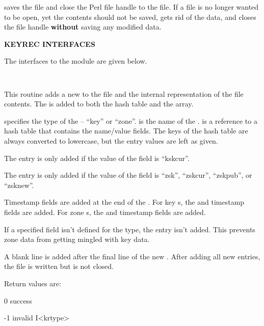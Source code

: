 saves the file and close the Perl file handle to the
 file.  If a  file is no longer wanted to be
open, yet the contents should not be saved,  gets rid
of the data, and closes the file handle {\bf without} saving any modified
data.

{\bf KEYREC INTERFACES}

The interfaces to the  module are given below.

\begin{description}

\item {}\verb" "

This routine adds a new  to the  file and the
internal representation of the file contents.  The  is added to
both the  hash table and the \var{\@keyreclines} array.

 specifies the type of the  -- ``key'' or
``zone''.   is the name of the .  
is a reference to a hash table that contains the name/value 
fields.  The keys of the hash table are always converted to lowercase, but the
entry values are left as given.

The  entry is only added if the value of the 
field is ``kskcur''.

The  entry is only added if the value of the 
field is ``zsk'', ``zskcur'', ``zskpub'', or ``zsknew''.

Timestamp fields are added at the end of the .  For key
s, the  and 
timestamp fields are added.  For zone s, the
 and  timestamp fields are added.

If a specified field isn't defined for the  type, the entry
isn't added.  This prevents zone  data from getting mingled
with key  data.

A blank line is added after the final line of the new .  After
adding all new  entries, the  file is written
but is not closed.

Return values are:

\begin{description}
\item 0 success
\item -1 invalid I<krtype>
\end{description}


\end{description}
